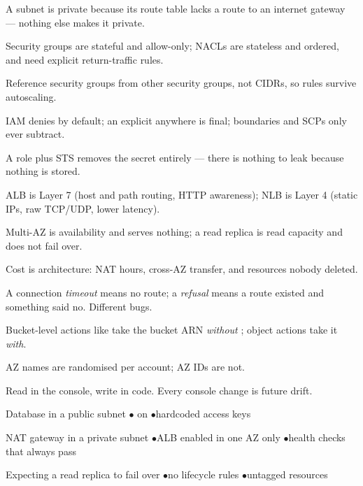 \begin{tickcheck}
  \item A subnet is private because its route table lacks a route to an internet gateway --- nothing else makes it private.
  \item Security groups are stateful and allow-only; NACLs are stateless and ordered, and need explicit return-traffic rules.
  \item Reference security groups from other security groups, not CIDRs, so rules survive autoscaling.
  \item IAM denies by default; an explicit  anywhere is final; boundaries and SCPs only ever subtract.
  \item A role plus STS removes the secret entirely --- there is nothing to leak because nothing is stored.
  \item ALB is Layer 7 (host and path routing, HTTP awareness); NLB is Layer 4 (static IPs, raw TCP/UDP, lower latency).
  \item Multi-AZ is availability and serves nothing; a read replica is read capacity and does not fail over.
  \item Cost is architecture: NAT hours, cross-AZ transfer, and resources nobody deleted.
\end{tickcheck}

\begin{wbitem}
  \item A connection \emph{timeout} means no route; a \emph{refusal} means a route existed and something said no. Different bugs.
  \item Bucket-level actions like  take the bucket ARN \emph{without} \code{/*}; object actions take it \emph{with}.
  \item AZ names are randomised per account; AZ IDs are not.
  \item Read in the console, write in code. Every console change is future drift.
\end{wbitem}

\begin{wbitem}
  \item Database in a public subnet \quad$\bullet$\quad {} on \code{*} \quad$\bullet$\quad hardcoded access keys
  \item NAT gateway in a private subnet \quad$\bullet$\quad ALB enabled in one AZ only \quad$\bullet$\quad health checks that always pass
  \item Expecting a read replica to fail over \quad$\bullet$\quad no lifecycle rules \quad$\bullet$\quad untagged resources
\end{wbitem}

